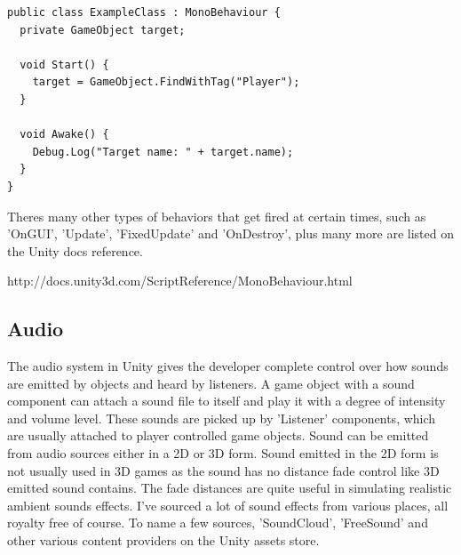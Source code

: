 \begin{verbatim}
public class ExampleClass : MonoBehaviour {
  private GameObject target;
  
  void Start() {
    target = GameObject.FindWithTag("Player");
  }
  
  void Awake() {
    Debug.Log("Target name: " + target.name);
  }
}
\end{verbatim}

Theres many other types of behaviors that get fired at certain times, such as 'OnGUI', 'Update', 'FixedUpdate' and 'OnDestroy', plus many more are listed on the Unity docs reference.

http://docs.unity3d.com/ScriptReference/MonoBehaviour.html

\subsection{Audio}
The audio system in Unity gives the developer complete control over how sounds are emitted by objects and heard by listeners. A game object with a sound component can attach a sound file to itself and play it with a degree of intensity and volume level. These sounds are picked up by 'Listener' components, which are usually attached to player controlled game objects. Sound can be emitted from audio sources either in a 2D or 3D form. Sound emitted in the 2D form is not usually used in 3D games as the sound has no distance fade control like 3D emitted sound contains. The fade distances are quite useful in simulating realistic ambient sounds effects.
I’ve sourced a lot of sound effects from various places, all royalty free of course. To name a few sources, 'SoundCloud', 'FreeSound' and other various content providers on the Unity assets store.

